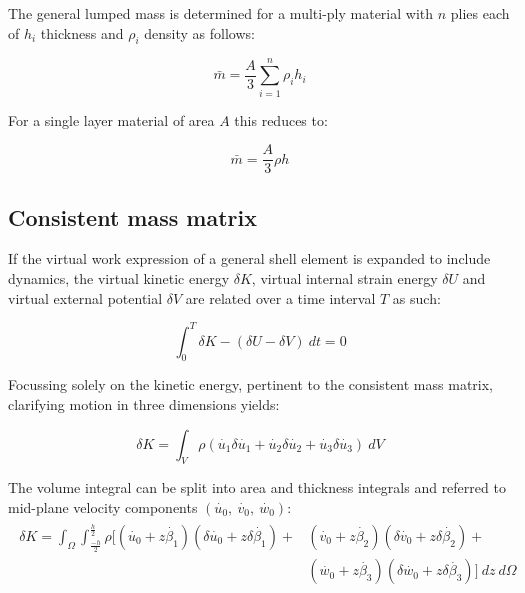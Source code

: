 The general lumped mass is determined for a multi-ply material with $n$ plies each of $h_i$ thickness and $\rho_i$ density as follows:

\begin{equation} 
\bar{m} = \frac{A}{3} \sum_{i=1}^n \rho_i h_i
\label{eqt16}
\end{equation}

For a single layer material of area $A$ this reduces to:

\begin{equation} 
\bar{m} = \frac{A}{3} \rho h
\label{eqt17}
\end{equation}

\subsection{Consistent mass matrix}
If the virtual work expression of a general shell element is expanded to include dynamics, the virtual kinetic energy $\delta K$, virtual internal strain energy $\delta U$ and virtual external potential $\delta V$ are related over a time interval $T$ as such:

\begin{equation} 
\int_{0}^{T} \delta K - (\delta U - \delta V) \ dt = 0
\label{eqt17_1}
\end{equation}

Focussing solely on the kinetic energy, pertinent to the consistent mass matrix, clarifying motion in three dimensions yields:

\begin{equation} 
\delta K = \int_{V} \rho 
(
\dot{u_1} \delta \dot{u_1} + 
\dot{u_2} \delta \dot{u_2} + 
\dot{u_3} \delta \dot{u_3}
)
\ dV
\label{eqt17_2}
\end{equation}

The volume integral can be split into area and thickness integrals and referred to mid-plane velocity components $(\dot{u_0},\ \dot{v_0},\ \dot{w_0})$:
\begin{gather} 
	\begin{aligned}
		\delta K = \int_{\Omega} \int_{\frac{-h}{2}}^{\frac{h}{2}} \rho 
		\Big[
		(\dot{u_0} + z\dot{\beta_1})  (\delta \dot{u_0} + z\delta\dot{\beta_1})+ 
		&(\dot{v_0} + z\dot{\beta_2})  (\delta \dot{v_0} + z\delta\dot{\beta_2})+
		\\
		&(\dot{w_0} + z\dot{\beta_3})  (\delta \dot{w_0} + z\delta\dot{\beta_3})
		\Big]
		\ dz
		\ d\Omega
		\label{eqt17_3}
	\end{aligned}
\end{gather}

